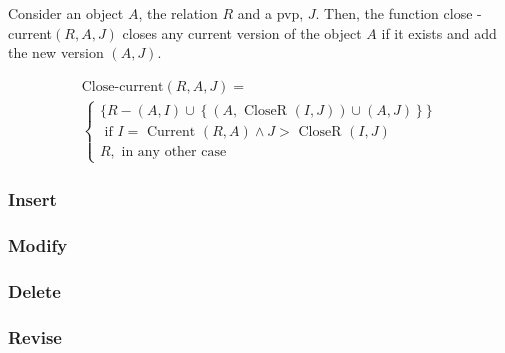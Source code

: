 \begin{definition}
\label{def:pvp-close-current-version}
Consider an object $A$, the relation $R$ and a pvp, $J$. Then, the function close - current$\left(R, A, J \right)$ closes any current version of the object $A$ if it exists and add the new version $\left(A, J \right)$.

\begin{eqnarray}
\label{eq:pvp-close-current}
\text{Close-current} \left(R, A, J \right) =\\
\begin{cases}
\nonumber
\big \lbrace R - \left(A, I \right) \cup \left \lbrace \left(A, \mbox{ CloseR } \left(I, J\right) \right) \cup \left(A, J\right)\right \rbrace  \big \rbrace \\
\nonumber
\mbox{ if } I = \mbox{ Current } \left(R, A \right) \wedge J > \mbox{ CloseR } \left(I, J \right)   \\
\nonumber R , \text{ in any other case}
\end{cases}
\end{eqnarray}
\end{definition}

\subsubsection{\label{subsubsec:insert-fuzzy-temporal}Insert}

\subsubsection{\label{subsubsec:modify-fuzzy-temporal}Modify}

\subsubsection{\label{subsubsec:delete-fuzzy-temporal}Delete}

\subsubsection{\label{subsubsec:revise-fuzzy-temporal}Revise}

